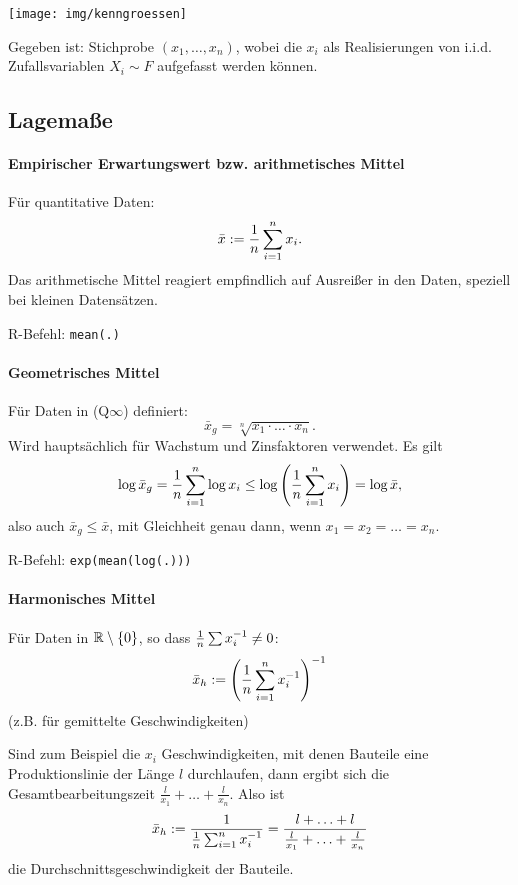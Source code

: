 \begin{center}
  \texttt{[image: img/kenngroessen]}
\end{center}

Gegeben ist: Stichprobe $(x_1, \ldots, x_n)$, wobei die $x_i$ als Realisierungen
von i.i.d. Zufallsvariablen $X_i \sim F$ aufgefasst werden können.

\subsection{Lagemaße}
\paragraph{Empirischer Erwartungswert bzw. arithmetisches Mittel}
Für quantitative Daten:
\[ \bar{x} := \frac{1}{n} \sum_{i=1}^n x_i. \]
Das arithmetische Mittel reagiert empfindlich auf Ausreißer in den Daten,
speziell bei kleinen Datensätzen.

R-Befehl: \verb+mean(.)+

\paragraph{Geometrisches Mittel}
Für Daten in (Q$\infty$) definiert:
\[ \bar{x}_g = \sqrt[n]{ x_1 \cdot \ldots \cdot x_n }. \]
Wird hauptsächlich für Wachstum und Zinsfaktoren verwendet. Es gilt
\[ \log \bar{x}_g = \frac{1}{n} \sum_{i=1}^n \log x_i \le \log \left( \frac{1}{n}
    \sum_{i=1}^n x_i \right) = \log \bar{x}, \]
also auch $\bar{x}_g \le \bar{x}$, mit Gleichheit genau dann, wenn $x_1 = x_2 =
\ldots = x_n$.

R-Befehl: \verb+exp(mean(log(.)))+

\paragraph{Harmonisches Mittel}
Für Daten in $\mathbb{R} \setminus \{0\}$, so dass $\frac{1}{n} \sum x_i^{-1} \ne 0$:
\[ \bar{x}_h := \left( \frac{1}{n} \sum_{i=1}^n x_i^{-1} \right)^{-1} \]
(z.B. für gemittelte Geschwindigkeiten)

Sind zum Beispiel die $x_i$ Geschwindigkeiten, mit denen Bauteile eine
Produktionslinie der Länge $l$ durchlaufen, dann ergibt sich die
Gesamtbearbeitungszeit $\frac{l}{x_1} + \ldots + \frac{l}{x_n}$. Also ist
\[ \bar{x}_h := \frac{1}{\frac{1}{n} \sum_{i=1}^n x_i^{-1}} =
  \frac{l + \ldots + l}{\frac{l}{x_1} + \ldots + \frac{l}{x_n}} \]
die Durchschnittsgeschwindigkeit der Bauteile.

